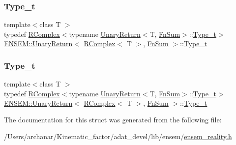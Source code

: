 \subsubsection{\texorpdfstring{Type\_t}{Type\_t}\hspace{0.1cm}{\footnotesize\ttfamily [1/2]}}
{\footnotesize\ttfamily template$<$class T $>$ \\
typedef \mbox{\hyperlink{classENSEM_1_1RComplex}{R\+Complex}}$<$typename \mbox{\hyperlink{structENSEM_1_1UnaryReturn}{Unary\+Return}}$<$T, \mbox{\hyperlink{structENSEM_1_1FnSum}{Fn\+Sum}}$>$\+::\mbox{\hyperlink{structENSEM_1_1UnaryReturn_3_01RComplex_3_01T_01_4_00_01FnSum_01_4_a466a9eef64139dc94681a73722d48328}{Type\+\_\+t}}$>$ \mbox{\hyperlink{structENSEM_1_1UnaryReturn}{E\+N\+S\+E\+M\+::\+Unary\+Return}}$<$ \mbox{\hyperlink{classENSEM_1_1RComplex}{R\+Complex}}$<$ T $>$, \mbox{\hyperlink{structENSEM_1_1FnSum}{Fn\+Sum}} $>$\+::\mbox{\hyperlink{structENSEM_1_1UnaryReturn_3_01RComplex_3_01T_01_4_00_01FnSum_01_4_a466a9eef64139dc94681a73722d48328}{Type\+\_\+t}}}

\mbox{\label{structENSEM_1_1UnaryReturn_3_01RComplex_3_01T_01_4_00_01FnSum_01_4_a466a9eef64139dc94681a73722d48328}} 
\subsubsection{\texorpdfstring{Type\_t}{Type\_t}\hspace{0.1cm}{\footnotesize\ttfamily [2/2]}}
{\footnotesize\ttfamily template$<$class T $>$ \\
typedef \mbox{\hyperlink{classENSEM_1_1RComplex}{R\+Complex}}$<$typename \mbox{\hyperlink{structENSEM_1_1UnaryReturn}{Unary\+Return}}$<$T, \mbox{\hyperlink{structENSEM_1_1FnSum}{Fn\+Sum}}$>$\+::\mbox{\hyperlink{structENSEM_1_1UnaryReturn_3_01RComplex_3_01T_01_4_00_01FnSum_01_4_a466a9eef64139dc94681a73722d48328}{Type\+\_\+t}}$>$ \mbox{\hyperlink{structENSEM_1_1UnaryReturn}{E\+N\+S\+E\+M\+::\+Unary\+Return}}$<$ \mbox{\hyperlink{classENSEM_1_1RComplex}{R\+Complex}}$<$ T $>$, \mbox{\hyperlink{structENSEM_1_1FnSum}{Fn\+Sum}} $>$\+::\mbox{\hyperlink{structENSEM_1_1UnaryReturn_3_01RComplex_3_01T_01_4_00_01FnSum_01_4_a466a9eef64139dc94681a73722d48328}{Type\+\_\+t}}}



The documentation for this struct was generated from the following file\+:\begin{DoxyCompactItemize}
\item 
/\+Users/archanar/\+Kinematic\+\_\+factor/adat\+\_\+devel/lib/ensem/\mbox{\hyperlink{lib_2ensem_2ensem__reality_8h}{ensem\+\_\+reality.\+h}}\end{DoxyCompactItemize}
